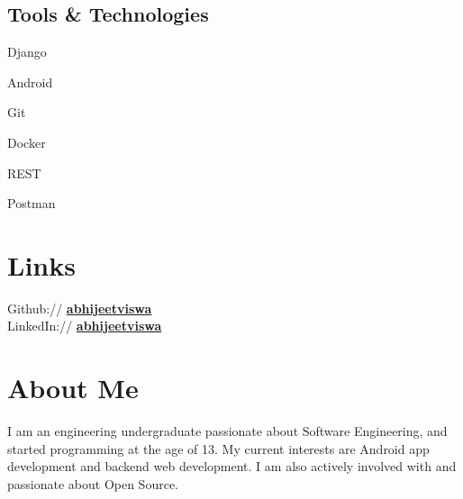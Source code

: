 \documentclass[]{abhijeet_viswa-deedy-resume-openfont}
\begin{document}
\begin{minipage}[t]{0.25\textwidth}
\subsection{Tools \& Technologies}
\begin{itemize*}
 \item Django
 \item Android
 \item Git
 \item Docker
 \item REST
 \item Postman
\end{itemize*}
\secondarysectionsep

\section{Links}
Github:// \mbox{\href{https://github.com/abhijeetviswa}{\bf abhijeetviswa}}\\[3pt]
LinkedIn://  \mbox{\href{https://www.linkedin.com/in/abhijeetviswa}{\bf abhijeetviswa}} \\
\secondarysectionsep


\section{About Me}
\noindent \RaggedRight \normalfont
I am an engineering undergraduate passionate about Software Engineering, and started
programming at the age of 13. My current interests are Android app development and
backend web development. I am also actively involved with and passionate about Open Source.

%
%

\end{minipage}
\end{document}
